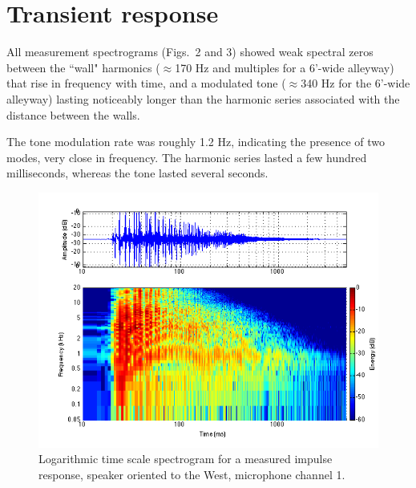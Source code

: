 \documentclass{aes137}
\begin{document}
\section{Transient response}
All measurement spectrograms (Figs.~2 and 3) showed weak spectral zeros between the ``wall" harmonics ($\approx$170 Hz and multiples for a 6'-wide alleyway) that rise in frequency with time, and a modulated tone ($\approx$340 Hz for the 6'-wide alleyway) lasting noticeably longer than the harmonic series associated with the distance between the walls. 

The tone modulation rate was roughly 1.2 Hz, indicating the presence of two modes, very close in frequency. The harmonic series lasted a few hundred milliseconds, whereas the tone lasted several seconds.

\begin{figure}[h] \centering \includegraphics[width=\linewidth, trim=10mm 5mm 2mm 7mm, clip]{images/logspectrogram.png} \caption{Logarithmic time scale spectrogram for a measured impulse response, speaker oriented to the West, microphone channel 1.} \end{figure}
\end{document}
